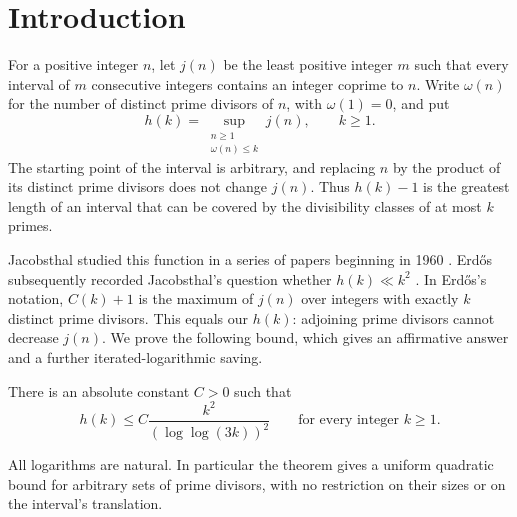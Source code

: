 \section{Introduction}

For a positive integer $n$, let $j(n)$ be the least positive integer $m$
such that every interval of $m$ consecutive integers contains an integer
coprime to $n$. Write $\omega(n)$ for the number of distinct prime divisors
of $n$, with $\omega(1)=0$, and put
\[
 h(k)=\sup_{\substack{n\ge1\\\omega(n)\le k}}j(n),\qquad k\ge1.
\]
The starting point of the interval is arbitrary, and replacing $n$ by
the product of its distinct prime divisors does not change $j(n)$.
Thus $h(k)-1$ is the greatest length of an interval that can be covered
by the divisibility classes of at most $k$ primes.

Jacobsthal studied this function in a series of papers beginning in
1960 \cite{Jacobsthal1960}. Erd\H{o}s subsequently recorded Jacobsthal's question
whether $h(k)\ll k^2$ \cite[p.~163, equations (1) and (3)]{Erdos1962}.
In Erd\H{o}s's notation, $C(k)+1$ is the maximum of $j(n)$ over integers
with exactly $k$ distinct prime divisors. This equals our $h(k)$:
adjoining prime divisors cannot decrease $j(n)$.
We prove the following bound, which gives an affirmative answer and a
further iterated-logarithmic saving.

\begin{theorem}\label{thm:main}
There is an absolute constant $C>0$ such that
\[
 h(k)\le C\frac{k^2}{(\log\log(3k))^2}
 \qquad\text{for every integer }k\ge1.
\]
\end{theorem}

All logarithms are natural. In particular the theorem gives a
uniform quadratic bound for arbitrary sets of prime divisors, with
no restriction on their sizes or on the interval's translation.

